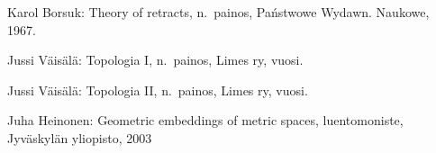 \documentclass[12pt,a4paper,leqno]{report}
\theoremstyle{plain}
\theoremstyle{definition}
\theoremstyle{remark}
\begin{document}


\begin{thebibliography}{9}

Karol Borsuk: Theory of retracts, n.\ painos, Państwowe Wydawn. Naukowe, 1967.

Jussi Väisälä: Topologia I, n.\ painos, Limes ry, vuosi.

Jussi Väisälä: Topologia II, n.\ painos, Limes ry, vuosi.

Juha Heinonen: Geometric embeddings of metric spaces, luentomoniste, Jyväskylän yliopisto, 2003


\end{thebibliography}
\end{document}
